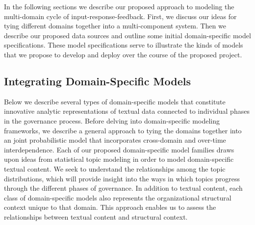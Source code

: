 In the following sections we describe our proposed approach to
modeling the multi-domain cycle of input-response-feedback. First, we
discuss our ideas for tying different domains together into a
multi-component system. Then we describe our proposed data sources and
outline some initial domain-specific model specifications. These model
specifications serve to illustrate the kinds of models that we propose
to develop and deploy over the course of the proposed project.

\subsection{Integrating Domain-Specific Models}




Below we describe several types of domain-specific models that
constitute innovative analytic representations of textual data
connected to individual phases in the governance process. Before
delving into domain-specific modeling frameworks, we describe a
general approach to tying the domains together into an joint
probabilistic model that incorporates cross-domain and over-time
interdependence. Each of our proposed domain-specific model families
draws upon ideas from statistical topic modeling in order to model
domain-specific textual content. We seek to understand the
relationships among the topic distributions,
which will provide insight into the ways in which topics progress
through the different phases of governance.  In addition to textual
content, each class of domain-specific models also represents the
organizational structural context unique to that domain. This approach
enables us to assess the relationships between textual content and
structural context.




